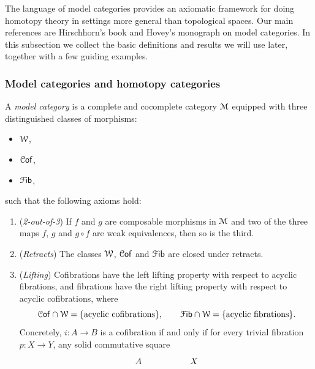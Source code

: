 The language of model categories provides an axiomatic framework for doing
homotopy theory in settings more general than topological spaces.  Our main
references are Hirschhorn's book \cite{Hir14} and Hovey's monograph on model
categories.  In this subsection we collect the basic definitions and results
we will use later, together with a few guiding examples.



\subsubsection{Model categories and homotopy categories}


\begin{definition}
  A \emph{model category} is a complete and cocomplete category
  $\mathcal M$ equipped with three distinguished classes of morphisms:
  \begin{itemize}
    \item {} $\mathcal W$,
    \item {} $\mathcal C\mathsf{of}$,
    \item {} $\mathcal F\mathsf{ib}$,
  \end{itemize}
  such that the following axioms hold:
  \begin{enumerate}
    \item[(MC1)] (\emph{2-out-of-3}) If $f$ and $g$ are composable morphisms
      in $\mathcal M$ and two of the three maps $f$, $g$ and $g \circ f$ are weak
      equivalences, then so is the third.
    \item[(MC2)] (\emph{Retracts}) The classes $\mathcal W$, $\mathcal C\mathsf{of}$ and
      $\mathcal F\mathsf{ib}$ are closed under retracts.
    \item[(MC3)] (\emph{Lifting}) Cofibrations have the left lifting property
      with respect to acyclic fibrations, and fibrations have the right
      lifting property with respect to acyclic cofibrations, where
      \begin{equation}
        \mathcal C\mathsf{of} \cap \mathcal W = \{\text{acyclic cofibrations}\}, \qquad
        \mathcal F\mathsf{ib} \cap \mathcal W = \{\text{acyclic fibrations}\}.
      \end{equation}
      Concretely, $i\colon A \to B$ is a cofibration if and only if for every
      trivial fibration $p\colon X \to Y$, any solid commutative square
      \begin{equation}
        \begin{tikzcd}[ampersand replacement=\&]
            A \&\& X \\

\end{tikzcd}
\end{equation}
\end{enumerate}
\end{definition}
